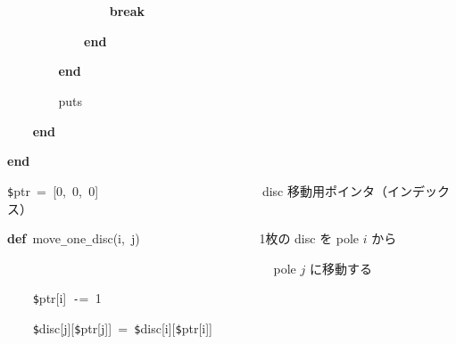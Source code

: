 \documentclass[a4paper,10pt]{article}
\def\mc{\relax}
\begin{document}
\noindent
\mbox{}{\tt\mc \ }{\tt\mc \ }{\tt\mc \ }{\tt\mc \ }{\tt\mc \ }{\tt\mc \ }{\tt\mc \ }{\tt\mc \ }{\tt\mc \ }{\tt\mc \ }{\tt\mc \ }{\tt\mc \ }{\tt\mc \ }{\tt\mc \ }{\tt\mc \ }{\tt\mc \ }\textbf{break}

\noindent
\mbox{}{\tt\mc \ }{\tt\mc \ }{\tt\mc \ }{\tt\mc \ }{\tt\mc \ }{\tt\mc \ }{\tt\mc \ }{\tt\mc \ }{\tt\mc \ }{\tt\mc \ }{\tt\mc \ }{\tt\mc \ }\textbf{end}

\noindent
\mbox{}{\tt\mc \ }{\tt\mc \ }{\tt\mc \ }{\tt\mc \ }{\tt\mc \ }{\tt\mc \ }{\tt\mc \ }{\tt\mc \ }\textbf{end}

\noindent
\mbox{}{\tt\mc \ }{\tt\mc \ }{\tt\mc \ }{\tt\mc \ }{\tt\mc \ }{\tt\mc \ }{\tt\mc \ }{\tt\mc \ }puts

\noindent
\mbox{}{\tt\mc \ }{\tt\mc \ }{\tt\mc \ }{\tt\mc \ }\textbf{end}

\noindent
\mbox{}\textbf{end}

\noindent
\mbox{}\hfill

\noindent
\mbox{}{\tt\$}ptr{\tt\mc \ }={\tt\mc \ }[0,{\tt\mc \ }0,{\tt\mc \ }0]{\tt\mc \ }{\tt\mc \ }{\tt\mc \ }{\tt\mc \ }{\tt\mc \ }{\tt\mc \ }{\tt\mc \ }{\tt\mc \ }{\tt\mc \ }{\tt\mc \ }{\tt\mc \ }{\tt\mc \ }{\tt\mc \ }{\tt\mc \ }{\tt\mc \ }{\tt\mc \ }{\tt\mc \ }{\tt\mc \ }{\tt\mc \ }{\tt\mc \ }{\tt\mc \ }{\tt\mc \ }{\tt\mc \ }{\tt\mc \ }\rm\mc {\tt\#} \ disc 移動用ポインタ（インデックス）\hfill 
\tt\mc 

\noindent
\mbox{}\hfill

\noindent
\mbox{}\textbf{def}{\tt\mc \ }move{\tt\_}one{\tt\_}disc(i,{\tt\mc \ }j){\tt\mc \ }{\tt\mc \ }{\tt\mc \ }{\tt\mc \ }{\tt\mc \ }{\tt\mc \ }{\tt\mc \ }{\tt\mc \ }{\tt\mc \ }{\tt\mc \ }{\tt\mc \ }{\tt\mc \ }{\tt\mc \ }{\tt\mc \ }{\tt\mc \ }{\tt\mc \ }{\tt\mc \ }\rm\mc {\tt\#} \ 1枚の disc を pole $i$ から\hfill 
\tt\mc 

\noindent
\mbox{}{\tt\mc \ }{\tt\mc \ }{\tt\mc \ }{\tt\mc \ }{\tt\mc \ }{\tt\mc \ }{\tt\mc \ }{\tt\mc \ }{\tt\mc \ }{\tt\mc \ }{\tt\mc \ }{\tt\mc \ }{\tt\mc \ }{\tt\mc \ }{\tt\mc \ }{\tt\mc \ }{\tt\mc \ }{\tt\mc \ }{\tt\mc \ }{\tt\mc \ }{\tt\mc \ }{\tt\mc \ }{\tt\mc \ }{\tt\mc \ }{\tt\mc \ }{\tt\mc \ }{\tt\mc \ }{\tt\mc \ }{\tt\mc \ }{\tt\mc \ }{\tt\mc \ }{\tt\mc \ }{\tt\mc \ }{\tt\mc \ }{\tt\mc \ }{\tt\mc \ }{\tt\mc \ }{\tt\mc \ }{\tt\mc \ }{\tt\mc \ }\rm\mc {\tt\#} \ pole $j$ に移動する \hfill 
\tt\mc 

\noindent
\mbox{}{\tt\mc \ }{\tt\mc \ }{\tt\mc \ }{\tt\mc \ }{\tt\$}ptr[i]{\tt\mc \ }{\tt -}={\tt\mc \ }1

\noindent
\mbox{}{\tt\mc \ }{\tt\mc \ }{\tt\mc \ }{\tt\mc \ }{\tt\$}disc[j][{\tt\$}ptr[j]]{\tt\mc \ }={\tt\mc \ }{\tt\$}disc[i][{\tt\$}ptr[i]]
\end{document}
